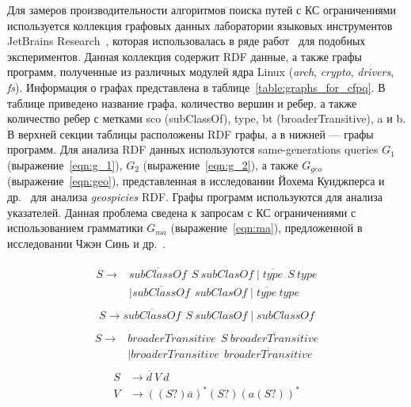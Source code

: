Для замеров производительности алгоритмов поиска путей с КС ограничениями используется коллекция графовых данных лаборатории языковых инструментов JetBrains Research~\cite{net:cfpq_data}, которая использовалась в ряде работ~\cite{inproceedings:matrix_cfpq, inproceedings:cfpq_matrix_evaluation, inbook:kronecker_cfpq_adbis, inproceedings:cfqp_matrix_with_single_source} для подобных экспериментов. 
Данная коллекция содержит RDF данные, а также графы программ, полученные из различных модулей ядра Linux (\textit{arch}, \textit{crypto}, \textit{drivers}, \textit{fs}). 
Информация о графах представлена в таблице~\ref{table:graphs_for_cfpq}. 
В таблице приведено название графа, количество вершин и ребер, а также количество ребер с метками sco (subClassOf), type, bt (broaderTransitive), a и b. В верхней секции таблицы расположены RDF графы, а в нижней --- графы программ. 
Для анализа RDF данных используются same-generations queries $G_1$ (выражение~\ref{eqn:g_1}), $G_2$ (выражение~\ref{eqn:g_2}), а также $G_{geo}$ (выражение~\ref{eqn:geo}), представленная в исследовании Йохема Куиджперса и др.~\cite{article:kuijpers_cfpq_exp_compare} для анализа \textit{geospicies} RDF. 
Графы программ используются для анализа указателей. 
Данная проблема сведена к запросам с КС ограничениями с использованием грамматики $G_{ma}$ (выражение~\ref{eqn:ma}), предложенной в исследовании Чжэн Синь и др.~\cite{Zheng:2008:DAA:1328897.1328464}.

\begin{align}
\begin{split}
\label{eqn:g_1}
S \to & \overline{\textit{subClassOf}} \ \ S \ \textit{subClasOf} \mid \overline{\textit{type}} \ \ S \ \textit{type}\\   & \mid \overline{\textit{subClassOf}} \ \ \textit{subClasOf} \mid \overline{\textit{type}} \ \textit{type}
\end{split}
\end{align}
\begin{align}
\begin{split}
\label{eqn:g_2}
S \to \overline{\textit{subClassOf}} \ \ S \ \textit{subClasOf} \mid \textit{subClassOf}
\end{split}
\end{align}
\begin{align}
\begin{split}
\label{eqn:geo}
S \to & \textit{broaderTransitive} \ \  S \ \overline{\textit{broaderTransitive}} \\
      & \mid \textit{broaderTransitive} \ \  \overline{\textit{broaderTransitive}}
\end{split}
\end{align}
\begin{align}
\begin{split}
\label{eqn:ma}
S & \to \overline{d} \ V \ d \\
V & \to ((S?) \overline{a})^* (S?) (a (S?))^*
\end{split}
\end{align}

